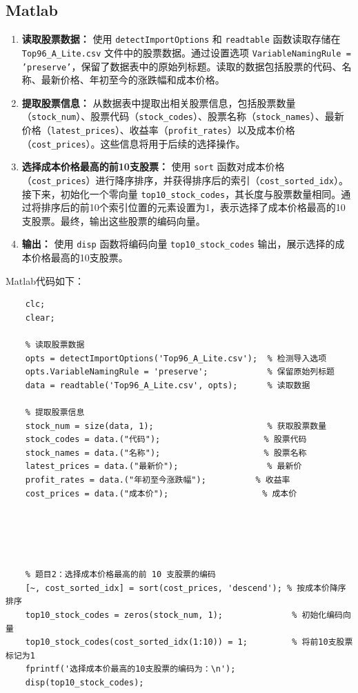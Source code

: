 \documentclass[journal,twoside,web]{ieeecolor}
\begin{document}
\subsection{Matlab}
\begin{enumerate}
    \item \textbf{读取股票数据：} 
    使用 \texttt{detectImportOptions} 和 \texttt{readtable} 函数读取存储在 \texttt{Top96\_A\_Lite.csv} 文件中的股票数据。通过设置选项 \texttt{VariableNamingRule = 'preserve'}，保留了数据表中的原始列标题。读取的数据包括股票的代码、名称、最新价格、年初至今的涨跌幅和成本价格。

    \item \textbf{提取股票信息：} 
    从数据表中提取出相关股票信息，包括股票数量（\texttt{stock\_num}）、股票代码（\texttt{stock\_codes}）、股票名称（\texttt{stock\_names}）、最新价格（\texttt{latest\_prices}）、收益率（\texttt{profit\_rates}）以及成本价格（\texttt{cost\_prices}）。这些信息将用于后续的选择操作。

    \item \textbf{选择成本价格最高的前10支股票：} 
    使用 \texttt{sort} 函数对成本价格（\texttt{cost\_prices}）进行降序排序，并获得排序后的索引（\texttt{cost\_sorted\_idx}）。接下来，初始化一个零向量 \texttt{top10\_stock\_codes}，其长度与股票数量相同。通过将排序后的前10个索引位置的元素设置为1，表示选择了成本价格最高的10支股票。最终，输出这些股票的编码向量。

    \item \textbf{输出：} 
    使用 \texttt{disp} 函数将编码向量 \texttt{top10\_stock\_codes} 输出，展示选择的成本价格最高的10支股票。
\end{enumerate}

Matlab代码如下：
\begin{lstlisting}
    clc;
    clear;
    
    % 读取股票数据
    opts = detectImportOptions('Top96_A_Lite.csv');  % 检测导入选项
    opts.VariableNamingRule = 'preserve';            % 保留原始列标题
    data = readtable('Top96_A_Lite.csv', opts);      % 读取数据
    
    % 提取股票信息
    stock_num = size(data, 1);                       % 获取股票数量
    stock_codes = data.("代码");                     % 股票代码
    stock_names = data.("名称");                     % 股票名称
    latest_prices = data.("最新价");                  % 最新价
    profit_rates = data.("年初至今涨跌幅");          % 收益率
    cost_prices = data.("成本价");                   % 成本价
    
    
    
    
    
    % 题目2：选择成本价格最高的前 10 支股票的编码
    [~, cost_sorted_idx] = sort(cost_prices, 'descend'); % 按成本价降序排序
    top10_stock_codes = zeros(stock_num, 1);              % 初始化编码向量
    top10_stock_codes(cost_sorted_idx(1:10)) = 1;         % 将前10支股票标记为1
    fprintf('选择成本价最高的10支股票的编码为：\n');
    disp(top10_stock_codes);
\end{lstlisting}
\end{document}
